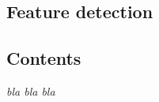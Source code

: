   \begin{titlepage}
    \vspace*{\fill}
      \part{Feature detection}
    \vspace*{\fill}
  \end{titlepage}

\chapter*{Contents}

\textit{bla bla bla}
\pagebreak


\newpage


